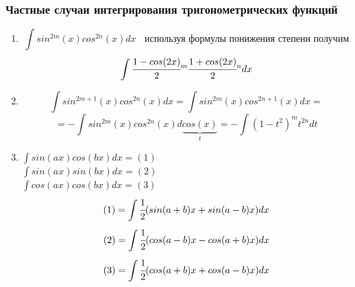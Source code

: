 \documentclass[a4paper]{article}
\theoremstyle{definition}
\numberwithin{theorem}{subsection}
\numberwithin{lemma}{subsection}
\numberwithin{definition}{subsection}
\numberwithin{comment*}{subsection}
\numberwithin{consequence}{subsection}
\numberwithin{property}{subsection}
\begin{document}
\subsubsection{Частные случаи интегрирования тригонометрических функций}
\begin{enumerate}
 \item $$\int sin^{2m}(x) cos^{2n}(x) dx \ \ \ \ \textit{используя формулы понижения степени получим} $$ $$  \int \cfrac{1-cos(2x)}{2}^m \cfrac{1+cos(2x)}{2}^n dx $$
 \item $$\int sin^{2m+1}(x) cos^{2n}(x) dx = \int sin^{2m}(x) cos^{2n+1}(x) dx = $$
       $$= - \int sin^{2m}(x) cos^{2n}(x) d \underbrace{cos(x)}_{t} = -\int (1-t^2)^m t^{2n} dt$$
 \item $\int sin(ax)cos(bx) dx = (1) $\\
       $\int sin(ax)sin(bx) dx = (2)$\\
       $\int cos(ax)cos(bx) dx = (3)$\\
       $$(1)=\int \cfrac{1}{2}(sin(a+b)x+sin(a-b)x) dx$$
       $$(2)=\int \cfrac{1}{2}(cos(a-b)x-cos(a+b)x) dx$$
       $$(3)=\int \cfrac{1}{2}(cos(a+b)x+cos(a-b)x) dx$$
\end{enumerate}
\end{document}
